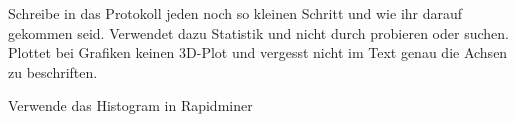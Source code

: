\begin{question}[section=1,name={Protokoll},difficulty=,mode=lab,type=thr,tags={2018}]
	Schreibe in das Protokoll jeden noch so kleinen Schritt und wie ihr darauf gekommen seid. Verwendet dazu Statistik und nicht durch probieren oder suchen. Plottet bei Grafiken keinen 3D-Plot und vergesst nicht im Text genau die Achsen zu beschriften.
\end{question}
\begin{solution}
	Verwende das Histogram in Rapidminer
\end{solution} 

